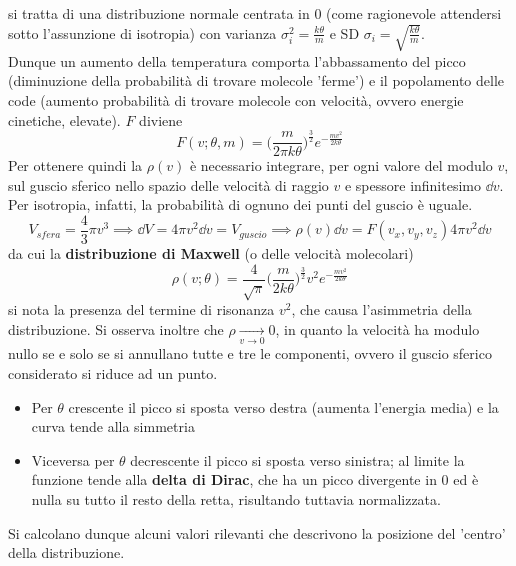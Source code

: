 \documentclass[10pt, oneside]{book}
\newcommand{\ds}{\displaystyle}
\newcommand{\tendsto}[2]{\xrightarrow[#1 \rightarrow #2]{}}
\begin{document}
si tratta di una distribuzione normale centrata in $0$ (come ragionevole attendersi sotto l'assunzione di isotropia) con varianza $\ds \sigma_i^2 = \frac{k \theta}{m}$ e SD $\ds \sigma_i = \sqrt{\frac{k \theta}{m}}$.
\\Dunque un aumento della temperatura comporta l'abbassamento del picco (diminuzione della probabilità di trovare molecole 'ferme') e il popolamento delle code (aumento probabilità di trovare molecole con velocità, ovvero energie cinetiche, elevate). $F$ diviene
\[F(v; \theta, m) = \bigg(\frac{m}{2 \pi k \theta}\bigg)^{\frac{3}{2}} e^{\displaystyle - \frac{mv^2}{2 k \theta}}\]
Per ottenere quindi la $\rho (v)$ è necessario integrare, per ogni valore del modulo $v$, sul guscio sferico nello spazio delle velocità di raggio $v$ e spessore infinitesimo $\dd{v}$. Per isotropia, infatti, la probabilità di ognuno dei punti del guscio è uguale.
\[V_{sfera} = \frac{4}{3} \pi v^3 \implies \dd{V} = 4 \pi v^2 \dd{v} = V_{guscio} \implies \rho(v) \dd{v} = F(v_x, v_y, v_z) 4 \pi v^2 \dd{v}\]
da cui la \textbf{distribuzione di Maxwell} (o delle velocità molecolari)
\[\boxed{\rho (v; \theta) = \frac{4}{\sqrt{\pi}} \bigg(\displaystyle \frac{m}{2k \theta}\bigg)^{ \frac{3}{2}} v^2 e^{\displaystyle - \frac{mv^2}{2k \theta}}}\]
si nota la presenza del termine di risonanza $v^2$, che causa l'asimmetria della distribuzione. Si osserva inoltre che $\ds \rho \tendsto{v}{0} 0$, in quanto la velocità ha modulo nullo se e solo se si annullano tutte e tre le componenti, ovvero il guscio sferico considerato si riduce ad un punto.
\begin{itemize}
\item Per $\theta$ crescente il picco si sposta verso destra (aumenta l'energia media) e la curva tende alla simmetria
\item Viceversa per $\theta$ decrescente il picco si sposta verso sinistra; al limite la funzione tende alla \textbf{delta di Dirac}, che ha un picco divergente in 0 ed è nulla su tutto il resto della retta, risultando tuttavia normalizzata.
\end{itemize}
Si calcolano dunque alcuni valori rilevanti che descrivono la posizione del 'centro' della distribuzione.
\end{document}
